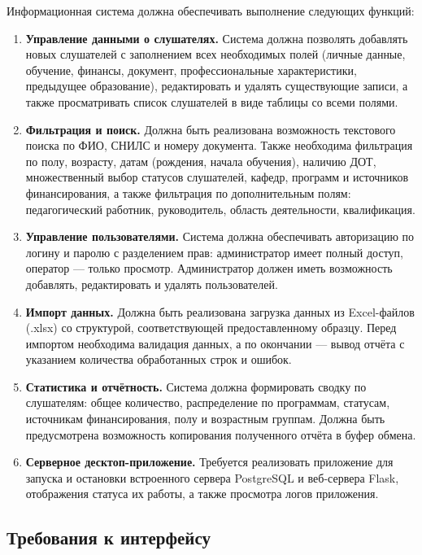 Информационная система должна обеспечивать выполнение следующих функций:

\begin{enumerate}
	\item \textbf{Управление данными о слушателях.} Система должна позволять добавлять новых слушателей с заполнением всех необходимых полей (личные данные, обучение, финансы, документ, профессиональные характеристики, предыдущее образование), редактировать и удалять существующие записи, а также просматривать список слушателей в виде таблицы со всеми полями.
	
	\item \textbf{Фильтрация и поиск.} Должна быть реализована возможность текстового поиска по ФИО, СНИЛС и номеру документа. Также необходима фильтрация по полу, возрасту, датам (рождения, начала обучения), наличию ДОТ, множественный выбор статусов слушателей, кафедр, программ и источников финансирования, а также фильтрация по дополнительным полям: педагогический работник, руководитель, область деятельности, квалификация.
	
	\item \textbf{Управление пользователями.} Система должна обеспечивать авторизацию по логину и паролю с разделением прав: администратор имеет полный доступ, оператор — только просмотр. Администратор должен иметь возможность добавлять, редактировать и удалять пользователей.
	
	\item \textbf{Импорт данных.} Должна быть реализована загрузка данных из Excel-файлов (.xlsx) со структурой, соответствующей предоставленному образцу. Перед импортом необходима валидация данных, а по окончании — вывод отчёта с указанием количества обработанных строк и ошибок.
	
	\item \textbf{Статистика и отчётность.} Система должна формировать сводку по слушателям: общее количество, распределение по программам, статусам, источникам финансирования, полу и возрастным группам. Должна быть предусмотрена возможность копирования полученного отчёта в буфер обмена.
	
	\item \textbf{Серверное десктоп-приложение.} Требуется реализовать приложение для запуска и остановки встроенного сервера PostgreSQL и веб-сервера Flask, отображения статуса их работы, а также просмотра логов приложения.
\end{enumerate}

\subsection{Требования к интерфейсу}

